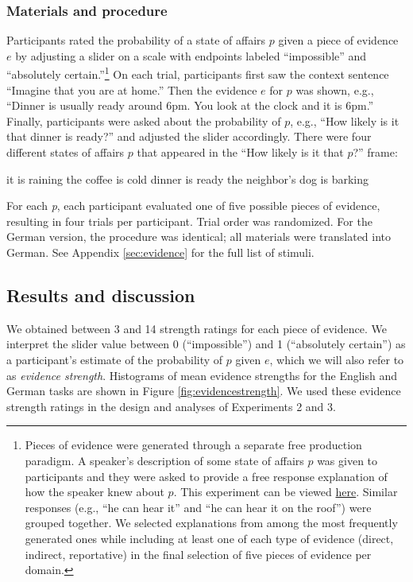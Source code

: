 \documentclass[11pt]{article}
\newcommand{\figref}[1]{Figure \ref{#1}}
\newcommand{\appref}[1]{Appendix \ref{#1}}
\begin{document}
\subsubsection{Materials and procedure}

Participants rated the probability of a state of affairs $p$ given a piece of evidence $e$ by adjusting a slider on a scale with endpoints labeled ``impossible'' and ``absolutely certain.''\footnote{Pieces of evidence were generated through a separate free production paradigm.  A speaker's description of some state of affairs $p$ was given to participants and they were asked to provide a free response explanation of how the speaker knew about $p$. This experiment can be viewed \href{http://stanford.edu/~jdegen/68_modals_freeproduction/modals.html}{here}. Similar responses (e.g., ``he can hear it'' and ``he can hear it on the roof'') were grouped together. We selected explanations from among the most frequently generated ones while including at least one of each type of evidence (direct, indirect, reportative) in the final selection of five pieces of evidence per domain.} On each trial, participants first saw the context sentence ``Imagine that you are at home.'' Then the evidence $e$ for $p$ was shown, e.g., ``Dinner is usually ready around 6pm. You look at the clock and it is 6pm.'' Finally, participants were asked about the probability of $p$, e.g., ``How likely is it that dinner is ready?'' and adjusted the slider accordingly. There were four different states of affairs $p$ that appeared in the ``How likely is it that $p$?'' frame:

\begin{exe}
\ex
\begin{xlist}
	\ex it is raining
	\ex the coffee is cold
	\ex dinner is ready
	\ex the neighbor's dog is barking
	\end{xlist}
\end{exe}

For each \emph{p}, each participant evaluated one of five possible pieces of evidence, resulting in four trials per participant. Trial order was randomized. 
For the German version, the procedure was identical; all materials were translated into German. See \appref{sec:evidence} for the full list of stimuli.

\subsection{Results and discussion}

We obtained between 3 and 14 strength ratings for each piece of evidence. We interpret the slider value between 0 (``impossible'') and 1 (``absolutely certain'') as a participant's estimate of the probability of $p$ given $e$, which we will also refer to as  \emph{evidence strength}. Histograms of mean evidence strengths for the English and German tasks are shown in \figref{fig:evidencestrength}.  We used these evidence strength ratings in the design and analyses of Experiments 2 and 3.
\end{document}
